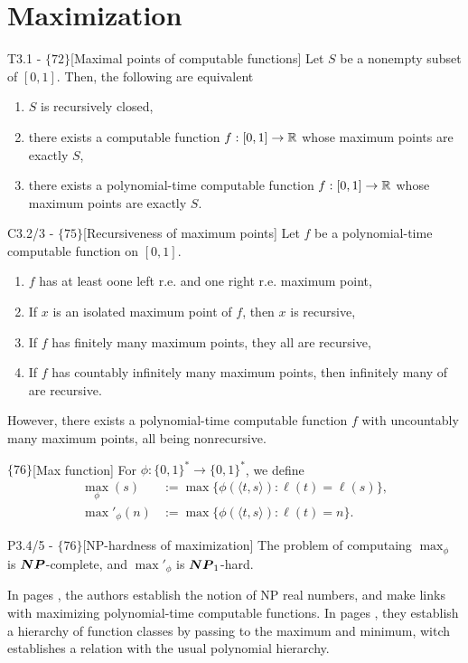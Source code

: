 \documentclass{article}
\begin{document}
\section{Maximization}

\begin{flexitheorem}{T3.1 - $\{72\}$}[Maximal points of computable functions]
    Let $S$ be a nonempty subset of $[0,1]$. Then, the following are equivalent
    \begin{enumerate}[label = (\alph*)]
        \item $S$ is recursively closed,
        \item there exists a computable function $f : [0,1] \to \mathbb{R}$ whose maximum points are exactly $S$,
        \item there exists a polynomial-time computable function $f: [0,1] \to \mathbb{R}$ whose maximum points are exactly $S$.
    \end{enumerate}
\end{flexitheorem}
\begin{flexilemma}{C3.2/3 - $\{75\}$}[Recursiveness of maximum points]
    Let $f$ be a polynomial-time computable function on $[0,1]$.
    \begin{enumerate}[label = (\alph*)]
        \item $f$ has at least oone left r.e. and one right r.e. maximum point,
        \item If $x$ is an isolated maximum point of $f$, then $x$ is recursive,
        \item If $f$ has finitely many maximum points, they all are recursive,
        \item If $f$ has countably infinitely many maximum points, then infinitely many of are recursive.
    \end{enumerate}
    However, there exists a polynomial-time computable function $f$ with uncountably many maximum points, all being nonrecursive.
\end{flexilemma}

\begin{flexidefinition}{$\{76\}$}[Max function]
    For $\phi : \{0,1\}^\ast \to \{0,1\}^\ast$, we define
    \begin{align}
        {\max}_\phi(s) &:= \max \{ \phi(\langle t,s\rangle) : \ell(t) = \ell(s) \},\\
        {\max}'_\phi(n) &:= \max \{ \phi(\langle t,s\rangle) : \ell(t) = n \}.
    \end{align}
\end{flexidefinition}
\begin{flexitheorem}{P3.4/5 - $\{76\}$}[NP-hardness of maximization]
    The problem of computaing $\max_\phi$ is $\boldsymbol{NP}$-complete, and $\max'_\phi$ is $\boldsymbol{NP}_1$-hard.
\end{flexitheorem}
In pages , the authors establish the notion of NP real numbers, and make links with maximizing polynomial-time computable functions. In pages , they establish a hierarchy of function classes by passing to the maximum and minimum, witch establishes a relation with the usual polynomial hierarchy. 

{}

\end{document}
